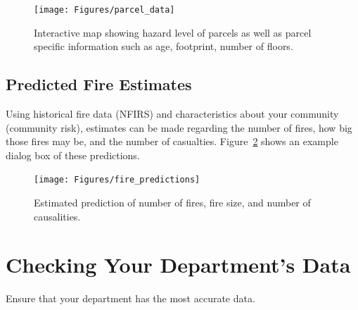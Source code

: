 \documentclass[12pt,oneside]{book}
\begin{document}
\begin{figure}[ht!]
\centering
\texttt{[image: Figures/parcel\_data]}
\caption{Interactive map showing hazard level of parcels as well as parcel specific information such as age, footprint, number of floors.}
\label{fig:parcel_data}
\end{figure}

\FloatBarrier

\section{Predicted Fire Estimates}

Using historical fire data (NFIRS) and characteristics about your community (community risk), estimates can be made regarding the number of fires, how big those fires may be, and the number of casualties. Figure~\ref{fig:fire_predictions} shows an example dialog box of these predictions.

\begin{figure}[ht!]
\centering
\texttt{[image: Figures/fire\_predictions]}
\caption{Estimated prediction of number of fires, fire size, and number of causalities.}
\label{fig:fire_predictions}
\end{figure}

\chapter{Checking Your Department's Data}

Ensure that your department has the most accurate data.
\end{document}

